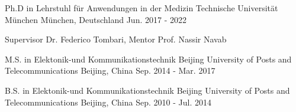 



\begin{cventries}

\cventry
{Ph.D in Lehrstuhl für Anwendungen in der Medizin} %
{Technische Universität München} %
{München, Deutschland} %
{Jun. 2017 - 2022} %
{ %
\begin{cvitems}
\item {Supervisor Dr. Federico Tombari, Mentor Prof. Nassir Navab}
\end{cvitems}
}


\cventry
{M.S. in Elektonik-und Kommunikationstechnik} %
{Beijing University of Posts and Telecommunications} %
{Beijing, China} %
{Sep. 2014 - Mar. 2017} %
{ %
\begin{cvitems}
\end{cvitems}
}


\cventry
{B.S. in Elektonik-und Kommunikationstechnik} %
{Beijing University of Posts and Telecommunications} %
{Beijing, China} %
{Sep. 2010 - Jul. 2014} %
{ %
\begin{cvitems}
\end{cvitems}
}%

\end{cventries}
